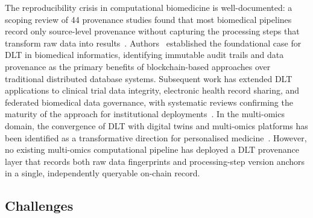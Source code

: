\documentclass[5p,times,twocolumn]{elsarticle}
\begin{document}
The reproducibility crisis in computational
biomedicine is well-documented: a scoping review
of 44 provenance studies found that most biomedical
pipelines record only source-level provenance
without capturing the processing steps that
transform raw data into results~\cite{johns2023data}.
Authors~\cite{kuo2017blockchain} established the
foundational case for DLT in biomedical informatics,
identifying immutable audit trails and data
provenance as the primary benefits of
blockchain-based approaches over traditional
distributed database systems.
Subsequent work has extended DLT applications
to clinical trial data integrity, electronic health
record sharing, and federated biomedical data
governance, with systematic reviews confirming
the maturity of the approach for institutional
deployments~\cite{lacson2024biomedical}.
In the multi-omics domain, the convergence of DLT
with digital twins and multi-omics platforms has
been identified as a transformative direction for
personalised medicine~\cite{mohr2024navigating}.
However, no existing multi-omics computational
pipeline has deployed a DLT provenance layer
that records both raw data fingerprints and
processing-step version anchors in a single,
independently queryable on-chain record.

\subsection{\textbf{Challenges}}
\end{document}
